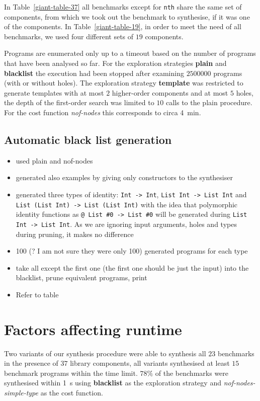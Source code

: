In Table~\ref{giant-table-37} all benchmarks except for \lstinline?nth? share the same set of components, from which we took out the benchmark to synthesise, if it was one of the components. In Table~\ref{giant-table-19}, in order to meet the need of all benchmarks, we used four different sets of $19$ components.

Programs are enumerated only up to a timeout based on the number of programs that have been analysed so far. For the exploration strategies \textbf{plain} and \textbf{blacklist} the execution had been stopped after examining $2500000$ programs (with or without holes). The exploration strategy \textbf{template} was restricted to generate templates with at most $2$ higher-order components and at most $5$ holes, the depth of the first-order search was limited to $10$ calls to the plain procedure. For the cost function \textit{nof-nodes} this corresponds to circa \SI{4}{min}.

\subsection{Automatic black list generation}\label{Black list generation}
\begin{itemize}
\item used plain and nof-nodes
\item generated also examples by giving only constructors to the synthesiser
\item generated three types of identity: \lstinline?Int -> Int?, \lstinline?List Int -> List Int? and \lstinline?List (List Int) -> List (List Int)? with the idea that polymorphic identity functions as \lstinline?@ List #0 -> List #0? will be generated during \lstinline?List Int -> List Int?. As we are ignoring input arguments, holes and types during pruning, it makes no difference
\item 100 (? I am not sure they were only 100) generated programs for each type
\item take all except the first one (the first one should be just the input) into the blacklist, prune equivalent programs, print
\item Refer to table
\end{itemize}


\section{Factors affecting runtime}\label{Factors affecting runtime}
Two variants of our synthesis procedure were able to synthesis all $23$ benchmarks in the presence of $37$ library components, all variants synthesised at least $15$ benchmark programs within the time limit. $78\%$ of the benchmarks were synthesised within \SI{1}{s} using \textbf{blacklist} as the exploration strategy and \textit{nof-nodes-simple-type} as the cost function.

